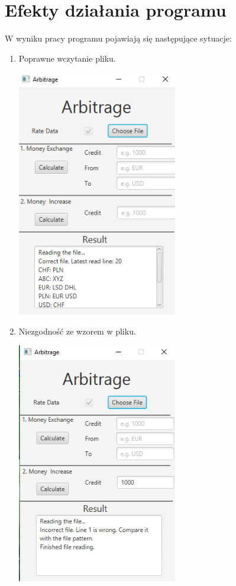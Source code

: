 \documentclass[a4paper,11pt]{article}
\begin{document}
\section{Efekty działania programu}
W wyniku pracy programu pojawiają się następujące sytuacje:
\begin{enumerate}
\item Poprawne wczytanie pliku.
\begin{center}
\includegraphics[width = 7cm]{DobryPlikWprowadzenie}
\end{center}
\item Niezgodność ze wzorem w pliku.
\begin{center}
\includegraphics[width = 7cm]{badfilepattern}

\end{center}
\end{enumerate}
\end{document}
